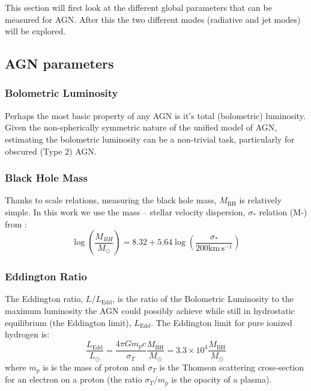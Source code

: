 	This section will first look at the different global parameters that can be measured for AGN. After this the two different modes (radiative and jet modes) will be explored.

	\subsection{AGN parameters}
		\label{subsec:introAGNparams}

		\subsubsection{Bolometric Luminosity}
			Perhaps the most basic property of any AGN is it's total (bolometric) luminosity. Given the non-spherically symmetric nature of the unified model of AGN, estimating the bolometric luminosity can be a non-trivial task, particularly for obscured (Type 2) AGN. 

		\subsubsection{Black Hole Mass}
			Thanks to scale relations, measuring the black hole mass, $M_\mathrm{BH}$ is relatively simple. In this work we use the mass -- stellar velocity dispersion, $\sigma_\ast$ relation (M-\textsigma) from \citet{McConnell2013}:
			\begin{equation}
				\log\left(\frac{M_{BH}}{M_\odot}\right) = 8.32 + 5.64 \log\left(\frac{\sigma_\ast}{200 \mathrm{km \, s^{-1}}}\right)
			\end{equation}


		\subsubsection{Eddington Ratio}
			The Eddington ratio, $L/L_\mathrm{Edd}$, is the ratio of the Bolometric Luminosity to the maximum luminosity the AGN could possibly achieve while still in hydrostatic equilibrium (the Eddington limit), $L_\mathrm{Edd}$. The Eddington limit for pure ionized hydrogen is:
			\begin{equation}
				\frac{L_\mathrm{Edd}}{L_\odot} = \frac{4 \pi G m_p c}{\sigma_T}	\frac{M_\mathrm{BH}}{M_\odot} = 3.3 \times 10^4 \frac{M_\mathrm{BH}}{M_\odot}
			\end{equation}
			where $m_p$ is is the mass of proton and $\sigma_T$ is the Thomson scattering cross-section for an electron on a proton (the ratio $\sigma_T/m_p$ is the opacity of a plasma). 

